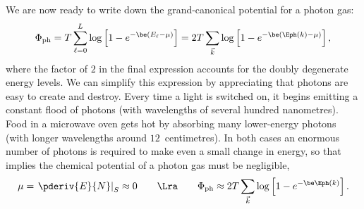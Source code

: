 We are now ready to write down the grand-canonical potential for a photon gas:
\begin{equation*}
  \Phi_{\text{ph}} = T \sum_{\ell = 0}^L \log\left[1 - e^{-\be (E_{\ell} - \mu)}\right] = 2T \sum_{\vec k} \log\left[1 - e^{-\be (\Eph(k) - \mu)}\right],
\end{equation*}
where the factor of $2$ in the final expression accounts for the doubly degenerate energy levels.
We can simplify this expression by appreciating that photons are easy to create and destroy.
Every time a light is switched on, it begins emitting a constant flood of photons (with wavelengths of several hundred nanometres).
Food in a microwave oven gets hot by absorbing many lower-energy photons (with longer wavelengths around $12$~centimetres).
In both cases an enormous number of photons is required to make even a small change in energy, so that  implies the chemical potential of a photon gas must be negligible,
\begin{equation*}
  \mu = \left.\pderiv{E}{N}\right|_S \approx 0 \qquad \Lra \qquad \Phi_{\text{ph}} \approx 2T \sum_{\vec k} \log\left[1 - e^{-\be \Eph(k)}\right].
\end{equation*}


